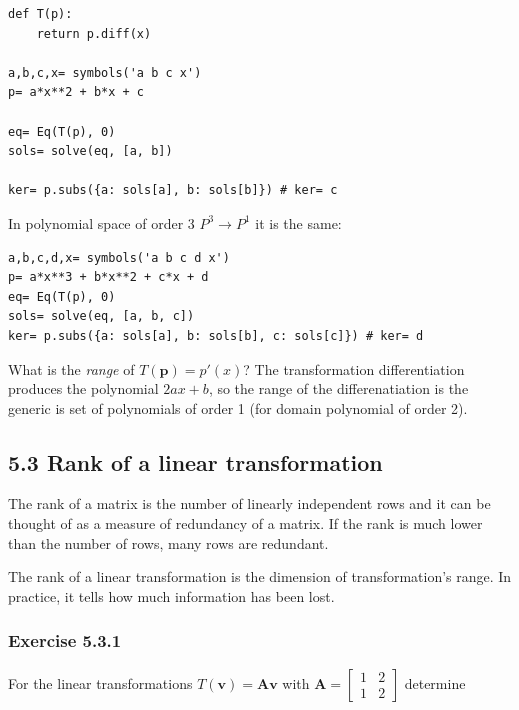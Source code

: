 \begin{verbatim}
def T(p):
    return p.diff(x)

a,b,c,x= symbols('a b c x')
p= a*x**2 + b*x + c

eq= Eq(T(p), 0)
sols= solve(eq, [a, b])

ker= p.subs({a: sols[a], b: sols[b]}) # ker= c
\end{verbatim}

In polynomial space of order 3 $P^3 \rightarrow P^1$ it is the same:

\begin{verbatim}
a,b,c,d,x= symbols('a b c d x')
p= a*x**3 + b*x**2 + c*x + d
eq= Eq(T(p), 0)
sols= solve(eq, [a, b, c])
ker= p.subs({a: sols[a], b: sols[b], c: sols[c]}) # ker= d
\end{verbatim}

What is the \emph{range} of $T(\mathbf{p}) = p\prime(x)$? The transformation
differentiation produces the polynomial $2ax + b$, so the range of the differenatiation
is the generic is set of polynomials of order 1 (for domain polynomial of
order 2).

\subsection{5.3 Rank of a linear transformation}

The rank of a matrix is the number of linearly independent rows and it can be thought
of as a measure of redundancy of a matrix. If the rank is much lower than the number
of rows, many rows are redundant.

The rank of a linear transformation is the dimension of transformation's range.
In practice, it tells how much information has been lost.

\subsubsection{Exercise 5.3.1}

For the linear transformations $T(\mathbf{v}) = \mathbf{Av}$ with $\mathbf{A} = \left[\begin{matrix}1 & 2\\1 & 2\end{matrix}\right]$ determine

